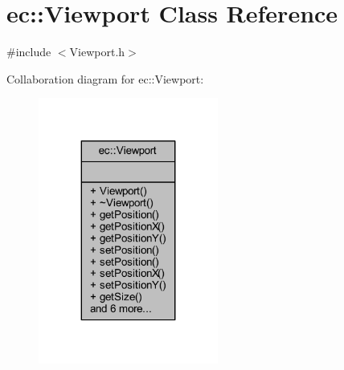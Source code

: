 \hypertarget{classec_1_1_viewport}{}\section{ec\+:\+:Viewport Class Reference}
\label{classec_1_1_viewport}


{\ttfamily \#include $<$Viewport.\+h$>$}



Collaboration diagram for ec\+:\+:Viewport\+:\nopagebreak
\begin{figure}[H]
\begin{center}
\leavevmode
\includegraphics[width=167pt]{classec_1_1_viewport__coll__graph}
\end{center}
\end{figure}
